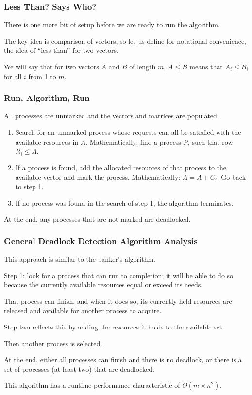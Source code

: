 \begin{frame}
\frametitle{Less Than? Says Who?}

There is one more bit of setup before we are ready to run the algorithm. 

The key idea is comparison of vectors, so let us define for notational convenience, the idea of ``less than'' for two vectors.

We will say that for two vectors $A$ and $B$ of length $m$,  $A \leq B$ means that $A_{i} \leq B_{i}$ for all $i$ from 1 to $m$.

\end{frame}

\begin{frame}
\frametitle{Run, Algorithm, Run}

All processes are unmarked and the vectors and matrices are populated. 

\begin{enumerate}
	\item Search for an unmarked process whose requests can all be satisfied with the available resources in $A$. Mathematically: find a process $P_{i}$ such that row $R_{i} \leq A$.
	\item If a process is found, add the allocated resources of that process to the available vector and mark the process. Mathematically: $A = A + C_{i}$. Go back to step 1.
	\item If no process was found in the search of step 1, the algorithm terminates.
\end{enumerate}

At the end, any processes that are not marked are deadlocked.

\end{frame}

\begin{frame}
\frametitle{General Deadlock Detection Algorithm Analysis}

This approach is similar to the banker's algorithm. 

Step 1: look for a process that can run to completion; it will be able to do so because the currently available resources equal or exceed its needs. 

That process can finish, and when it does so, its currently-held resources are released and available for another process to acquire. 

Step two reflects this by adding the resources it holds to the available set. 

Then another process is selected. 

At the end, either all processes can finish and there is no deadlock, or there is a set of processes (at least two) that are deadlocked. 

This algorithm has a runtime performance characteristic of $\Theta(m \times n^{2})$.


\end{frame}

